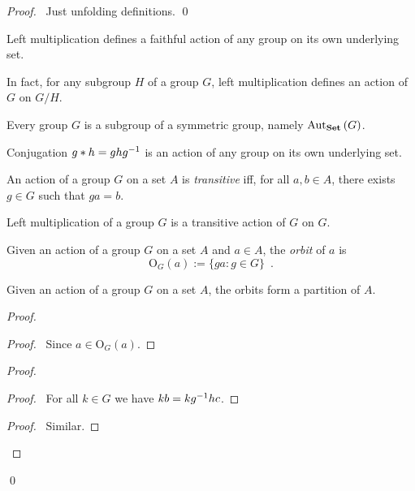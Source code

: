 \begin{proof}
\pf\ Just unfolding definitions. \qed
\end{proof}

\begin{ex}
Left multiplication defines a faithful action of any group on its own underlying set.

In fact, for any subgroup $H$ of a group $G$, left multiplication defines an action of $G$ on $G/H$.
\end{ex}

\begin{cor}
Every group $G$ is a subgroup of a symmetric group, namely $\mathrm{Aut}_{\mathbf{Set}} \left( {G} \right)$.
\end{cor}

\begin{ex}
Conjugation $g * h = gh{g}^{-1}$ is an action of any group on its own underlying set.
\end{ex}

\begin{df}[Transitive]
An action of a group $G$ on a set $A$ is \emph{transitive} iff, for all $a,b \in A$, there exists $g \in G$ such that $ga = b$.
\end{df}

\begin{ex}
Left multiplication of a group $G$ is a transitive action of $G$ on $G$.
\end{ex}

\begin{df}[Orbit]
Given an action of a group $G$ on a set $A$ and $a \in A$, the \emph{orbit} of $a$ is
\[ \mathrm{O}_G(a) := \{ ga : g \in G \} \enspace . \]
\end{df}

\begin{prop}
Given an action of a group $G$ on a set $A$, the orbits form a partition of $A$.
\end{prop}

\begin{proof}
\pf
{}
\begin{proof}
\pf\ Since $a \in \mathrm{O}_G(a)$.
\end{proof}
\begin{proof}
\begin{proof}
\pf\ For all $k \in G$ we have $kb = k{g}^{-1}hc$.
\end{proof}
\begin{proof}
\pf\ Similar.
\end{proof}
\end{proof}
\qed
\end{proof}

